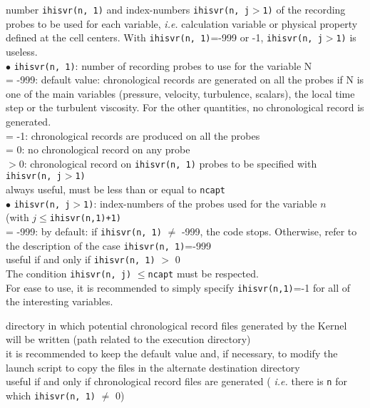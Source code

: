 {number {\tt ihisvr(n, 1)} and index-numbers {\tt ihisvr(n, j$>$1)} of the recording
probes to be used for each variable, {\em i.e.} calculation variable
or physical property defined at the cell centers.
With {\tt ihisvr(n, 1)}=-999 or -1, {\tt ihisvr(n, j$>$1)} is useless.\\
\hspace*{.5cm} $\bullet$ {\tt ihisvr(n, 1)}: number of recording probes to use
for the variable N\\
\hspace*{1.3cm}= -999: default value: chronological records are generated on
all the probes if N is one of the main variables (pressure, velocity,
turbulence, scalars), the local time step or the turbulent
viscosity. For the other quantities, no chronological record is generated.\\
\hspace*{1.3cm}= -1: chronological records are produced on all the probes\\
\hspace*{1.3cm}= 0: no chronological record on any probe\\
\hspace*{1.3cm}$>0$: chronological record on {\tt ihisvr(n, 1)} probes to be
specified with  {\tt ihisvr(n, j$>$1)}\\
always useful, must be less than or equal to {\tt ncapt}\\
\hspace*{.5cm} $\bullet$ {\tt ihisvr(n, j$>$1)}: index-numbers of the probes
used for the variable $n$\\
(with $j \leqslant${\tt ihisvr(n,1)+1)}\\
\hspace*{1.3cm}= -999: by default: if {\tt ihisvr(n, 1)} $\ne$
-999, the  code stops. Otherwise, refer to the description of the case
{\tt ihisvr(n, 1)}=-999\\
useful if and only if {\tt ihisvr(n, 1)} $>$ 0 \\
The condition {\tt ihisvr(n, j)} $\leqslant${\tt ncapt} must be respected.\\
For ease to use, it is recommended to simply specify {\tt ihisvr(n,1)}=-1 for
all of the interesting variables.}

{directory in which potential chronological record files generated by
the Kernel will be written (path related to the execution directory)\\
it is recommended to keep the default value and, if necessary, to modify the
launch script to copy the files in the alternate destination directory\\
useful if and only if chronological record files are generated ({\em
i.e.} there is {\tt n} for which {\tt ihisvr(n, 1)} $\ne$ 0)}

